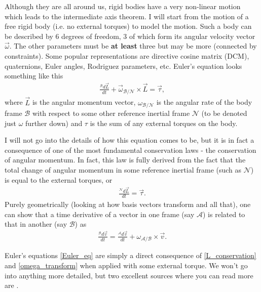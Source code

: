 \documentclass[a4paper]{article}
\begin{document}
	Although they are all around us, rigid bodies have a very non-linear motion which leads to the intermediate axis theorem.
	I will start from the motion of a free rigid body (i.e. no external torques) to model the motion.
	Such a body can be described by 6 degrees of freedom, 3 of which form its angular velocity vector $\vec{\omega}$.
	The other parameters must be \textbf{at least} three but may be more (connected by constraints).
	Some popular representations are directive cosine matrix (DCM), quaternions, Euler angles, Rodriguez parameters, etc.
	Euler's equation looks something like this
	\begin{eqnarray}\label{Euler_eq}
		\frac{{}^{\mathcal{B}}d \vec{L} }{dt} + \vec{ \omega }_{\mathcal{B/N}}\times\vec{L} = \vec{\tau},
	\end{eqnarray}
	where $\vec{L}$ is the angular momentum vector, $\omega_{\mathcal{B/N}}$ is the angular rate of the body frame $\mathcal{B}$ with respect to some other reference inertial frame $\mathcal{N}$ (to be denoted just $\omega$ further down) and $\tau$ is the sum of any external torques on the body.
	
	I will not go into the details of how this equation comes to be, but it is in fact a consequence of one of the most fundamental conservation laws - the conservation of angular momentum.
	In fact, this law is fully derived from the fact that the total change of angular momentum in some reference inertial frame (such as $\mathcal{N}$) is equal to the external torques, or
	\begin{eqnarray}\label{L_conservation}
		\frac{{}^{\mathcal{N}}d \vec{L} }{dt} = \vec{\tau}.
	\end{eqnarray}
	Purely geometrically (looking at how basis vectors transform and all that), one can show that a time derivative of a vector in one frame (say $\mathcal{A}$) is related to that in another (say $\mathcal{B}$) as
	\begin{eqnarray}\label{omega_transform}
		\frac{{}^{\mathcal{B}}d \vec{v} }{dt} = \frac{{}^{\mathcal{A}}d \vec{v} }{dt} + \omega_{\mathcal{A/B}}\times\vec{v}.
	\end{eqnarray}

	Euler's equations \eqref{Euler_eq} are simply a direct consequence of \eqref{L_conservation} and \eqref{omega_transform} when applied with some external torque.
	We won't go into anything more detailed, but two excellent sources where you can read more are \cite{David_Tong,Goldstein}.
\end{document}
